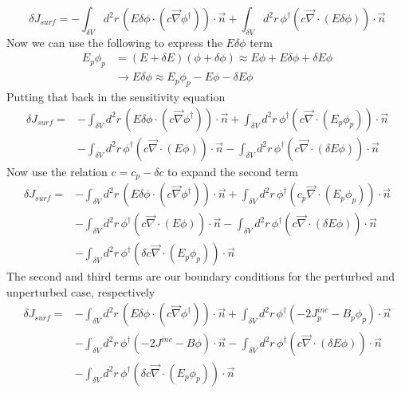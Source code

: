 \documentclass{article}
\newcommand{\vdiv}{\vec{\nabla} \cdot}
\newcommand{\vgrad}{\vec{\nabla}}
\begin{document}
\[
\delta J_{surf} = - \int_{\delta V} d^2 r \, \left( E \delta \phi \cdot \left( c  \vgrad \phi^\dag \right)\right) \cdot \vec{n} + \int_{\delta V} d^2 r \, \phi^\dag \left( c \vdiv \left( E \delta \phi \right) \right) \cdot \vec{n} 
\]
Now we can use the following to express the $E \delta \phi$ term
\begin{align*}
E_p \phi_p &= (E + \delta E)(\phi + \delta \phi) \approx E \phi + E \delta \phi + \delta E \phi  \\
&\to E \delta \phi \approx E_p \phi_p - E \phi - \delta E \phi
\end{align*}
Putting that back in the sensitivity equation
\begin{align*}
\delta J_{surf} =& - \int_{\delta V} d^2 r \, \left( E \delta \phi \cdot \left( c  \vgrad \phi^\dag \right)\right) \cdot \vec{n} + \int_{\delta V} d^2 r \, \phi^\dag \left( c \vdiv \left( E_p \phi_p \right) \right) \cdot \vec{n} \\
&- \int_{\delta V} d^2 r \, \phi^\dag \left( c \vdiv \left(  E \phi \right) \right) \cdot \vec{n} - \int_{\delta V} d^2 r \, \phi^\dag \left( c \vdiv \left( \delta E \phi \right) \right) \cdot \vec{n}
\end{align*}
Now use the relation $c =c_p -\delta c $ to expand the second term
\begin{align*}
\delta J_{surf} =& - \int_{\delta V} d^2 r \, \left( E \delta \phi \cdot \left( c  \vgrad \phi^\dag \right)\right) \cdot \vec{n} + \int_{\delta V} d^2 r \, \phi^\dag \left( c_p \vdiv \left( E_p \phi_p \right) \right) \cdot \vec{n} \\
&- \int_{\delta V} d^2 r \, \phi^\dag \left( c \vdiv \left(  E \phi \right) \right) \cdot \vec{n} - \int_{\delta V} d^2 r \, \phi^\dag \left( c \vdiv \left( \delta E \phi \right) \right) \cdot \vec{n} \\
&- \int_{\delta V} d^2 r \, \phi^\dag \left( \delta c \vdiv \left( E_p \phi_p \right) \right) \cdot \vec{n}
\end{align*}
The second and third terms are our boundary conditions for the perturbed and unperturbed case, respectively
\begin{align*}
\delta J_{surf} =& - \int_{\delta V} d^2 r \, \left( E \delta \phi \cdot \left( c  \vgrad \phi^\dag \right)\right) \cdot \vec{n} + \int_{\delta V} d^2 r \, \phi^\dag \left(-2J_p^{inc} -B_p \phi_p \right) \cdot \vec{n} \\
&- \int_{\delta V} d^2 r \, \phi^\dag \left( -2J^{inc} -B \phi \right) \cdot \vec{n} - \int_{\delta V} d^2 r \, \phi^\dag \left( c \vdiv \left( \delta E \phi \right) \right) \cdot \vec{n} \\
&- \int_{\delta V} d^2 r \, \phi^\dag \left( \delta c \vdiv \left( E_p \phi_p \right) \right) \cdot \vec{n}
\end{align*}
\end{document}
